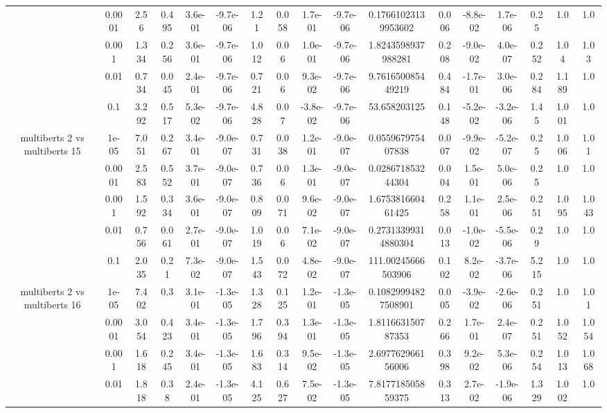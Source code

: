 \begin{tabular}{|c|c|c|c|c|c|c|c|c|c|c|c|c|c|c|c|c|}
 & 0.0001 & 2.56 & 0.495 & 3.6e-01 & -9.7e-06 & 1.21 & 0.058 & 1.7e-01 & -9.7e-06 & 0.17661023139953602 & 0.006 & -8.8e-02 & 1.7e-06 & 0.25 & 1.0 & 1.0 \\
 & 0.001 & 1.334 & 0.256 & 3.6e-01 & -9.7e-06 & 1.012 & 0.06 & 1.0e-01 & -9.7e-06 & 1.8243598937988281 & 0.208 & -9.0e-02 & 4.0e-07 & 0.252 & 1.04 & 1.03 \\
 & 0.01 & 0.734 & 0.045 & 2.4e-01 & -9.7e-06 & 0.721 & 0.06 & 9.3e-02 & -9.7e-06 & 9.761650085449219 & 0.484 & -1.7e-01 & 3.0e-06 & 0.284 & 1.189 & 1.0 \\
 & 0.1 & 3.292 & 0.517 & 5.3e-02 & -9.7e-06 & 4.828 & 0.07 & -3.8e-02 & -9.7e-06 & 53.658203125 & 0.148 & -5.2e-02 & -3.2e-06 & 1.45 & 1.001 & 1.0 \\
\hline
\multirow{5}{*}{multiberts 2 vs multiberts 15} & 1e-05 & 7.051 & 0.267 & 3.4e-01 & -9.0e-07 & 0.731 & 0.038 & 1.2e-01 & -9.0e-07 & 0.055967975407838 & 0.007 & -9.9e-02 & -5.2e-07 & 0.25 & 1.006 & 1.01 \\
 & 0.0001 & 2.583 & 0.552 & 3.7e-01 & -9.0e-07 & 0.736 & 0.06 & 1.3e-01 & -9.0e-07 & 0.028671853244304 & 0.004 & 1.5e-01 & 5.0e-06 & 0.25 & 1.0 & 1.0 \\
 & 0.001 & 1.592 & 0.334 & 3.6e-01 & -9.0e-07 & 0.809 & 0.071 & 9.6e-02 & -9.0e-07 & 1.675381660461425 & 0.258 & 1.1e-01 & 2.5e-06 & 0.251 & 1.095 & 1.043 \\
 & 0.01 & 0.756 & 0.061 & 2.7e-01 & -9.0e-07 & 1.019 & 0.06 & 7.1e-02 & -9.0e-07 & 0.27313399314880304 & 0.013 & -1.0e-02 & -5.5e-06 & 0.29 & 1.0 & 1.0 \\
 & 0.1 & 2.035 & 0.21 & 7.3e-02 & -9.0e-07 & 1.543 & 0.072 & 4.8e-02 & -9.0e-07 & 111.00245666503906 & 0.102 & 8.2e-02 & -3.7e-06 & 5.215 & 1.0 & 1.0 \\
\hline
\multirow{5}{*}{multiberts 2 vs multiberts 16} & 1e-05 & 7.402 & 0.3 & 3.1e-01 & -1.3e-05 & 1.328 & 0.125 & 1.2e-01 & -1.3e-05 & 0.10829994827508901 & 0.005 & -3.9e-02 & -2.6e-06 & 0.251 & 1.0 & 1.01 \\
 & 0.0001 & 3.054 & 0.423 & 3.4e-01 & -1.3e-05 & 1.796 & 0.394 & 1.3e-01 & -1.3e-05 & 1.811663150787353 & 0.266 & 1.7e-01 & 2.4e-07 & 0.251 & 1.052 & 1.054 \\
 & 0.001 & 1.618 & 0.245 & 3.4e-01 & -1.3e-05 & 1.683 & 0.314 & 9.5e-02 & -1.3e-05 & 2.697762966156006 & 0.398 & 9.2e-02 & 5.3e-06 & 0.254 & 1.013 & 1.068 \\
 & 0.01 & 1.818 & 0.38 & 2.4e-01 & -1.3e-05 & 4.125 & 0.627 & 7.5e-02 & -1.3e-05 & 7.817718505859375 & 0.313 & 2.7e-02 & -1.9e-06 & 1.329 & 1.002 & 1.0 \\

\end{tabular}
